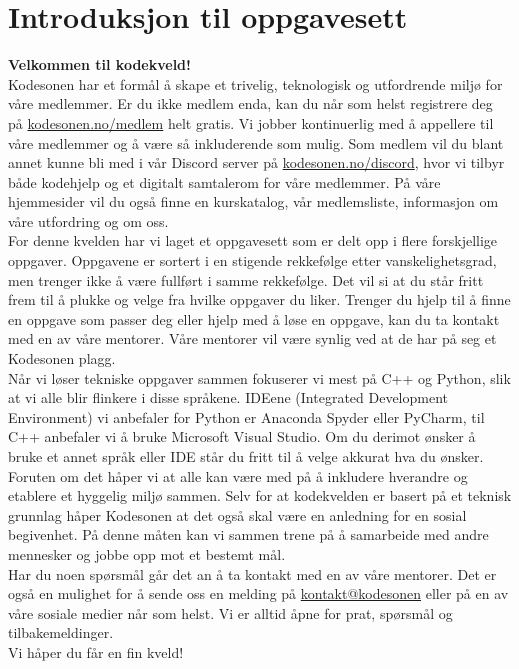 \section{Introduksjon til oppgavesett}

\textbf{Velkommen til kodekveld!} \\

Kodesonen har et formål å skape et trivelig, teknologisk og utfordrende miljø for våre medlemmer. Er du ikke medlem enda, kan du når som helst registrere deg på \url{kodesonen.no/medlem} helt gratis. Vi jobber kontinuerlig med å appellere til våre medlemmer og å være så inkluderende som mulig. Som medlem vil du blant annet kunne bli med i vår Discord server på \url{kodesonen.no/discord}, hvor vi tilbyr både kodehjelp og et digitalt samtalerom for våre medlemmer. På våre hjemmesider vil du også finne en kurskatalog, vår medlemsliste, informasjon om våre utfordring og om oss. \\

For denne kvelden har vi laget et oppgavesett som er delt opp i flere forskjellige oppgaver. Oppgavene er sortert i en stigende rekkefølge etter vanskelighetsgrad, men trenger ikke å være fullført i samme rekkefølge. Det vil si at du står fritt frem til å plukke og velge fra hvilke oppgaver du liker. Trenger du hjelp til å finne en oppgave som passer deg eller hjelp med å løse en oppgave, kan du ta kontakt med en av våre mentorer. Våre mentorer vil være synlig ved at de har på seg et Kodesonen plagg. \\

Når vi løser tekniske oppgaver sammen fokuserer vi mest på C++ og Python, slik at vi alle blir flinkere i disse språkene. IDEene (Integrated Development Environment) vi anbefaler for Python er Anaconda Spyder eller PyCharm, til C++ anbefaler vi å bruke Microsoft Visual Studio. Om du derimot ønsker å bruke et annet språk eller IDE står du fritt til å velge akkurat hva du ønsker. \\

Foruten om det håper vi at alle kan være med på å inkludere hverandre og etablere et hyggelig miljø sammen. Selv for at kodekvelden er basert på et teknisk grunnlag håper Kodesonen at det også skal være en anledning for en sosial begivenhet. På denne måten kan vi sammen trene på å samarbeide med andre mennesker og jobbe opp mot et bestemt mål. \\

Har du noen spørsmål går det an å ta kontakt med en av våre mentorer. Det er også en mulighet for å sende oss en melding på \url{kontakt@kodesonen} eller på en av våre sosiale medier når som helst. Vi er alltid åpne for prat, spørsmål og tilbakemeldinger. \\

Vi håper du får en fin kveld! \\
